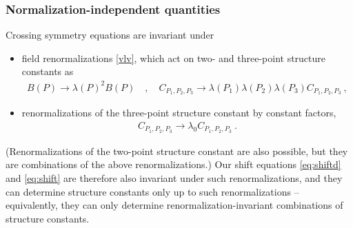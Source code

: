 \documentclass[12pt, a4paper, notitlepage, twoside]{report}
\numberwithin{equation}{section}
\theoremstyle{break}
\begin{document}
\subsubsection{Normalization-independent quantities} 

Crossing symmetry equations are invariant under 
\begin{itemize}
 \item field renormalizations \eqref{vlv}, which act on two- and three-point structure constants as 
 \begin{align}
 B(P) \to \lambda(P)^2 B(P) \quad , \quad C_{P_1,P_2,P_3} \to \lambda(P_1)\lambda(P_2)\lambda(P_3) C_{P_1,P_2,P_3}\ ,
\end{align}
\item renormalizations of the three-point structure constant by constant factors,
\begin{align}
 C_{P_1,P_2,P_3} \to \lambda_0 C_{P_1,P_2,P_3}\ .
 \label{clzc}
\end{align}
\end{itemize}
(Renormalizations of the two-point structure constant are also possible, but they are combinations of the above renormalizations.) Our shift equations \eqref{eq:shiftd} and \eqref{eq:shift} are therefore also invariant under such renormalizations, and they can determine structure constants only up to such renormalizations -- equivalently, they can only determine renormalization-invariant combinations of structure constants.
\end{document}
